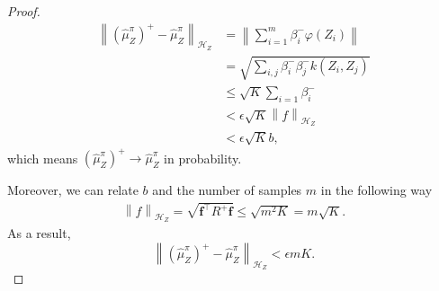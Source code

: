 \documentclass[a4paper]{article}
\renewcommand{\bf}{\mathbf}
\renewcommand{\cal}{\mathcal}
\newcommand{\norm}[1]{\left\lVert#1\right\rVert}
\newcommand{\T}{\intercal}
\begin{document}
\begin{proof}

\begin{align}
\norm{(\widehat{\mu}_Z^\pi)^+ - \widehat{\mu}_Z^\pi}_{\cal{H}_Z} &= \norm{\sum_{i=1}^m\beta_i^- \varphi(Z_i)}\\
&= \sqrt{\sum_{i,j} \beta_i^-\beta_j^- k(Z_i,Z_j) }\\
&\leq \sqrt{K} \sum_{i=1}\beta_i^-\\
&<  \epsilon\sqrt{K} \norm{f}_{\cal{H}_Z}\\
&<  \epsilon\sqrt{K}b,
\end{align}
which means $(\widehat{\mu}_Z^\pi)^+ \rightarrow \widehat{\mu}_Z^\pi$ in probability.

Moreover, we can relate $b$ and the number of samples $m$ in the following way
\begin{align}
 \norm{f}_{\cal{H}_Z} = \sqrt{\bf{f}^\T R^+ \bf{f}} \leq \sqrt{m^2 K} = m\sqrt{K}.
\end{align}
As a result,
\begin{equation}
\norm{(\widehat{\mu}_Z^\pi)^+ - \widehat{\mu}_Z^\pi}_{\cal{H}_Z} < \epsilon m K.
\end{equation}
\end{proof}
\end{document}
